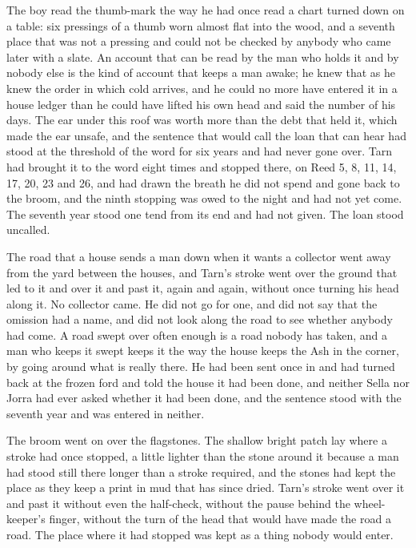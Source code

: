 The boy read the thumb-mark the way he had once read a chart turned down on a table: six pressings of a thumb worn almost flat into the wood, and a seventh place that was not a pressing and could not be checked by anybody who came later with a slate. An account that can be read by the man who holds it and by nobody else is the kind of account that keeps a man awake; he knew that as he knew the order in which cold arrives, and he could no more have entered it in a house ledger than he could have lifted his own head and said the number of his days. The ear under this roof was worth more than the debt that held it, which made the ear unsafe, and the sentence that would call the loan that can hear had stood at the threshold of the word for six years and had never gone over. Tarn had brought it to the word eight times and stopped there, on Reed 5, 8, 11, 14, 17, 20, 23 and 26, and had drawn the breath he did not spend and gone back to the broom, and the ninth stopping was owed to the night and had not yet come. The seventh year stood one tend from its end and had not given. The loan stood uncalled.

The road that a house sends a man down when it wants a collector went away from the yard between the houses, and Tarn's stroke went over the ground that led to it and over it and past it, again and again, without once turning his head along it. No collector came. He did not go for one, and did not say that the omission had a name, and did not look along the road to see whether anybody had come. A road swept over often enough is a road nobody has taken, and a man who keeps it swept keeps it the way the house keeps the Ash in the corner, by going around what is really there. He had been sent once in  and had turned back at the frozen ford and told the house it had been done, and neither Sella nor Jorra had ever asked whether it had been done, and the sentence stood with the seventh year and was entered in neither.

\scenebreak

The broom went on over the flagstones. The shallow bright patch lay where a stroke had once stopped, a little lighter than the stone around it because a man had stood still there longer than a stroke required, and the stones had kept the place as they keep a print in mud that has since dried. Tarn's stroke went over it and past it without even the half-check, without the pause behind the wheel-keeper's finger, without the turn of the head that would have made the road a road. The place where it had stopped was kept as a thing nobody would enter.

